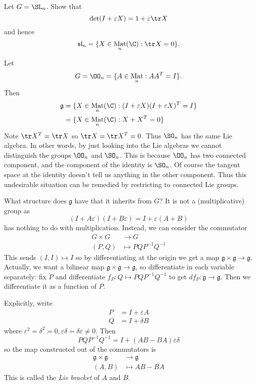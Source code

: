 \documentclass[a4paper]{article}
\DeclareMathOperator{\Mat}{Mat}
\newcommand*{\Lie}[1]{\mathfrak{#1}} %
\begin{document}
\begin{ex}
  Let \(G = \SL_n\). Show that
  \[
    \det (I + \varepsilon X) = 1 + \varepsilon \tr X
  \]
  and hence
  \[
    \Lie{sl}_n = \{X \in \Mat_n(\C): \tr X = 0\}.
  \]
\end{ex}

\begin{eg}
  Let
  \[
    G = \OO_n = \{A \in \Mat_n: AA^T = I\}.
  \]
  Then
  \begin{align*}
    \Lie g &= \{X \in \Mat_n(\C): (I + \varepsilon X)(I + \varepsilon X)^T = I\} \\
                &= \{X \in \Mat_n(\C): X + X^T = 0\}
  \end{align*}
  Note \(\tr X^T = \tr X\) so \(\tr X = \tr X^T = 0\). Thus \(\SO_n\) has the same Lie algebra. In other words, by just looking into the Lie algebras we cannot distinguish the groups \(\OO_n\) and \(\SO_n\). This is because \(\OO_n\) has two connected component, and the component of the identity is \(\SO_n\). Of course the tangent space at the identity doesn't tell us anything in the other component. Thus this undesirable situation can be remedied by restricting to connected Lie groups.
\end{eg}

What structure does \(\Lie g\) have that it inherits from \(G\)? It is not a (multiplicative) group as
\[
  (I + A \varepsilon) (I + B \varepsilon) = I + \varepsilon (A + B)
\]
has nothing to do with multiplication. Instead, we can consider the commutator
\begin{align*}
  G \times G &\to G \\
  (P, Q) &\mapsto PQP^{-1}Q^{-1}
\end{align*}
This sends \((I, I) \mapsto I\) so by differentiating at the origin we get a map \(\Lie g \times \Lie g \to \Lie g\). Actually, we want a bilinear map \(\Lie g \times \Lie g \to \Lie g\), so differentiate in each variable separately: fix \(P\) and differentiate \(f_P: Q \mapsto PQP^{-1}Q^{-1}\) to get \(df_P: \Lie g \to \Lie g\). Then we differentiate it as a function of \(P\).

Explicitly, write
\begin{align*}
  P &= I + \varepsilon A \\
  Q &= I + \delta B
\end{align*}
where \(\varepsilon^2 = \delta^2 = 0, \varepsilon \delta = \delta \varepsilon \neq 0\). Then
\[
  PQP^{-1}Q^{-1} = I + (AB - BA) \varepsilon\delta
\]
so the map constructed out of the commutators is
\begin{align*}
  \Lie g \times \Lie g &\to \Lie g \\
  (A, B) &\mapsto AB - BA
\end{align*}
This is called the \emph{Lie bracket} of \(A\) and \(B\).
\end{document}
